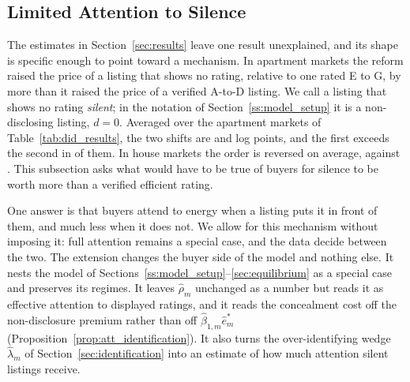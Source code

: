 
\subsection{Limited Attention to Silence}
\label{ss:attention}

The estimates in Section~\ref{sec:results} leave one result unexplained, and its shape is specific enough to point toward a mechanism. In apartment markets the reform raised the price of a listing that shows no rating, relative to one rated E to G, by more than it raised the price of a verified A-to-D listing. We call a listing that shows no rating \emph{silent}; in the notation of Section~\ref{ss:model_setup} it is a non-disclosing listing, $d=0$. Averaged over the \attNMarketsApt{} apartment markets of Table~\ref{tab:did_results}, the two shifts are \attDthreeApt{} and \attBthreeApt{} log points, and the first exceeds the second in \attNDgtBApt{} of them. In house markets the order is reversed on average, \attDthreeHouse{} against \attBthreeHouse{}. This subsection asks what would have to be true of buyers for silence to be worth more than a verified efficient rating.

One answer is that buyers attend to energy when a listing puts it in front of them, and much less when it does not. We allow for this mechanism without imposing it: full attention remains a special case, and the data decide between the two. The extension changes the buyer side of the model and nothing else. It nests the model of Sections~\ref{ss:model_setup}--\ref{sec:equilibrium} as a special case and preserves its regimes. It leaves $\hat\rho_m$ unchanged as a number but reads it as effective attention to displayed ratings, and it reads the concealment cost off the non-disclosure premium rather than off $\hat\beta_{1,m}\hat e^*_m$ (Proposition~\ref{prop:att_identification}). It also turns the over-identifying wedge $\hat\lambda_m$ of Section~\ref{sec:identification} into an estimate of how much attention silent listings receive.

